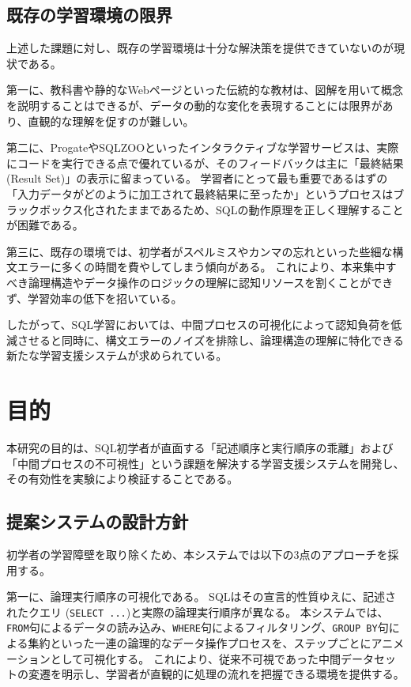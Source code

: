 \documentclass[uplatex,a4paper,12pt]{ujreport}
\begin{document}
\subsection{既存の学習環境の限界}
上述した課題に対し、既存の学習環境は十分な解決策を提供できていないのが現状である。
\par
第一に、教科書や静的なWebページといった伝統的な教材は、図解を用いて概念を説明することはできるが、データの動的な変化を表現することには限界があり、直観的な理解を促すのが難しい。
\par
第二に、ProgateやSQLZOOといったインタラクティブな学習サービスは、実際にコードを実行できる点で優れているが、そのフィードバックは主に「最終結果 (Result Set)」の表示に留まっている。
学習者にとって最も重要であるはずの「入力データがどのように加工されて最終結果に至ったか」というプロセスはブラックボックス化されたままであるため、SQLの動作原理を正しく理解することが困難である。
\par
第三に、既存の環境では、初学者がスペルミスやカンマの忘れといった些細な構文エラーに多くの時間を費やしてしまう傾向がある。
これにより、本来集中すべき論理構造やデータ操作のロジックの理解に認知リソースを割くことができず、学習効率の低下を招いている。
\par
したがって、SQL学習においては、中間プロセスの可視化によって認知負荷を低減させると同時に、構文エラーのノイズを排除し、論理構造の理解に特化できる新たな学習支援システムが求められている。

\section{目的}
本研究の目的は、SQL初学者が直面する「記述順序と実行順序の乖離」および「中間プロセスの不可視性」という課題を解決する学習支援システムを開発し、その有効性を実験により検証することである。
\subsection{提案システムの設計方針}
初学者の学習障壁を取り除くため、本システムでは以下の3点のアプローチを採用する。
\par
第一に、論理実行順序の可視化である。
SQLはその宣言的性質ゆえに、記述されたクエリ (\texttt{SELECT ...})と実際の論理実行順序が異なる。
本システムでは、\texttt{FROM}句によるデータの読み込み、\texttt{WHERE}句によるフィルタリング、\texttt{GROUP BY}句による集約といった一連の論理的なデータ操作プロセスを、ステップごとにアニメーションとして可視化する。
これにより、従来不可視であった中間データセットの変遷を明示し、学習者が直観的に処理の流れを把握できる環境を提供する。
\end{document}
